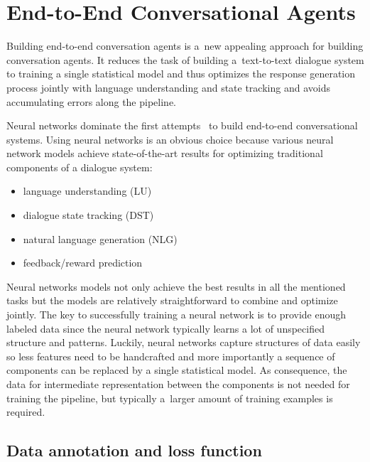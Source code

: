 \documentclass[11pt]{article}
\begin{document}
\section{End-to-End Conversational Agents}
\label{sec:e2end}
Building end-to-end conversation agents is a~new appealing approach for building conversation agents.
It reduces the task of building a~text-to-text dialogue system to training a single statistical model and thus optimizes the response generation process jointly with language understanding and state tracking and avoids accumulating errors along the pipeline.

Neural networks dominate the first attempts~\cite{williams2016end,bordes_learning_2016,weston2015endtoend_prereq} to build end-to-end conversational systems.
Using neural networks is an obvious choice because various neural network models achieve state-of-the-art results for optimizing traditional components of a dialogue system:
\begin{itemize}
    \item language understanding (LU) \cite{mairesse_spoken_2009} 
    \item dialogue state tracking (DST) \cite{williams_web-style_2014,henderson2014word,vodolan_hybrid_2015,platek_recurrent_2016}
    \item natural language generation (NLG) \cite{dusek_sequence2sequence_2016,wen_networkbased_2016}
    \item feedback/reward prediction \cite{su_learning_2015}
\end{itemize}
Neural networks models not only achieve the best results in all the mentioned tasks but the models are relatively straightforward to combine and optimize jointly.
The key to successfully training a neural network is to provide enough labeled data since the neural network typically learns a lot of unspecified structure and patterns.
Luckily, neural networks capture structures of data easily so less features need to be handcrafted and more importantly a sequence of components can be replaced by a single statistical model.
As consequence, the data for intermediate representation between the components is not needed for training the pipeline, but typically a~larger amount of training examples is required.

\subsection{Data annotation and loss function}
\label{sub:data_annotation}
\end{document}
